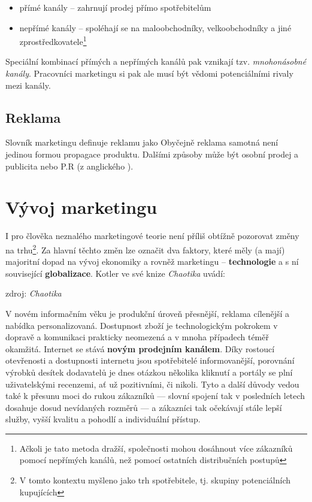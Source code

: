 \begin{itemize}
    \item přímé kanály -- zahrnují prodej přímo spotřebitelům
    \item nepřímé kanály -- spoléhají se na maloobchodníky, velkoobchodníky a jiné zprostředkovatele\footnote{Ačkoli je tato metoda dražší, společnosti mohou dosáhnout více zákazníků pomocí nepřímých kanálů, než pomocí ostatních distribučních postupů\cite["marketingový mix", s. 114]{clemente2004slovnikmarketingu}}
\end{itemize}

Speciální kombinací přímých a nepřímých kanálů pak vznikají tzv. \textit{mnohonásobné kanály}. Pracovníci marketingu si pak ale musí být vědomi potenciálními rivaly mezi kanály.


\subsection{Reklama}
Slovník marketingu definuje reklamu jako \cite["reklama", s. 115]{clemente2004slovnikmarketingu} Obyčejně reklama samotná není jedinou formou propagace produktu. Dalšími způsoby může být osobní prodej a publicita nebo P.R (z anglického ).


\section{Vývoj marketingu}

I pro člověka neznalého marketingové teorie není příliš obtížně pozorovat změny na trhu\footnote{V tomto kontextu myšleno jako trh spotřebitele, tj. skupiny potenciálních kupujících}.
Za hlavní  těchto změn lze označit dva faktory, které měly (a mají) majoritní dopad na vývoj ekonomiky a rovněž marketingu -- \textbf{technologie} a s ní související \textbf{globalizace}. Kotler ve své knize \textit{Chaotika}\cite[s. 14]{kotler2009chaotika} uvádí:

\begin{aquote}{zdroj: \textit{Chaotika}}
\end{aquote}

V novém informačním věku je produkční úroveň přesnější, reklama cílenější a nabídka personalizovaná. Dostupnost zboží je technologickým pokrokem v dopravě a komunikaci prakticky neomezená a v mnoha případech téměř okamžitá. Internet se stává \textbf{novým prodejním kanálem}. Díky rostoucí otevřenosti a dostupnosti internetu jsou spotřebitelé informovanější, porovnání výrobků desítek dodavatelů je dnes otázkou několika kliknutí a portály se plní uživatelskými recenzemi, ať už pozitivními, či nikoli.
Tyto a další důvody vedou také k přesunu moci do rukou zákazníků --- slovní spojení  tak v posledních letech dosahuje dosud nevídaných rozměrů --- a zákazníci tak očekávají stále lepší služby, vyšší kvalitu a pohodlí a individuální přístup.

